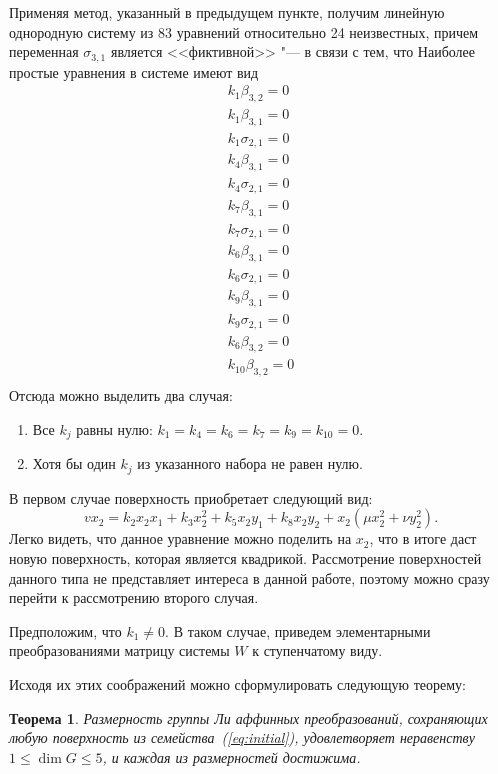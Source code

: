 \documentclass[a4paper,14pt]{extarticle}
\newtheorem{theorem}{Теорема}
\begin{document}
Применяя метод, указанный в предыдущем пункте, получим линейную однородную систему из 83 уравнений относительно 24 неизвестных, причем переменная $\sigma_{3,1}$ является <<фиктивной>> "--- в связи с тем, что   Наиболее простые уравнения в системе имеют вид
\begin{equation}
\begin{array}{l}
 k_1 \beta _{3,2}=0 \\
 k_1 \beta _{3,1}=0 \\
 k_1 \sigma _{2,1}=0 \\
 k_4 \beta _{3,1}=0 \\
 k_4 \sigma _{2,1}=0 \\
 k_7 \beta _{3,1}=0 \\
 k_7 \sigma _{2,1}=0 \\
 k_6 \beta _{3,1}=0 \\
 k_6 \sigma _{2,1}=0 \\
 k_9 \beta _{3,1}=0 \\
 k_9 \sigma _{2,1}=0 \\
 k_6 \beta _{3,2}=0 \\
 k_{10} \beta _{3,2}=0 \\
\end{array}
\end{equation}
Отсюда можно выделить два случая:
\begin{enumerate}
	\item Все $k_j$ равны нулю: $k_1 = k_4 = k_6 = k_7 = k_9 = k_{10} = 0$.
	\item Хотя бы один $k_j$ из указанного набора не равен нулю.
\end{enumerate}
В первом случае поверхность приобретает следующий вид:
\begin{equation*}
v x_2 = k_2 x_2 x_1 + k_3 x_2^2 + k_5 x_2 y_1 + k_8 x_2 y_2 + x_2 (\mu x_2^2 + \nu y_2^2).
\end{equation*}
Легко видеть, что данное уравнение можно поделить на $x_2$, что в итоге даст новую поверхность, которая является квадрикой. Рассмотрение поверхностей данного типа не представляет интереса в данной работе, поэтому можно сразу перейти к рассмотрению второго случая.

Предположим, что $k_1 \ne 0 $. В таком случае, приведем элементарными преобразованиями матрицу системы $W$ к ступенчатому виду. 

Исходя их этих соображений можно сформулировать следующую теорему: 
\begin{theorem} Размерность группы Ли аффинных преобразований, сохраняющих любую поверхность из семейства~(\ref{eq:initial}), удовлетворяет неравенству $1 \le \dim G \le 5$, и каждая из размерностей достижима.
\end{theorem}
\end{document}
